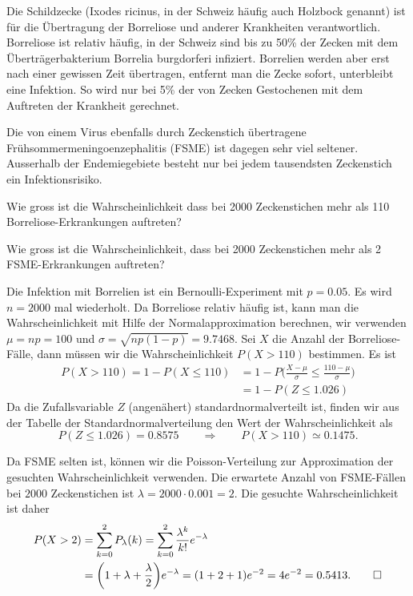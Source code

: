 Die Schildzecke (Ixodes ricinus, in der Schweiz häufig auch Holzbock genannt) 
ist für die Über\-tragung der Borreliose und anderer Krankheiten verantwortlich.
Borreliose ist relativ häufig, in der Schweiz sind bis zu 50\% der Zecken mit
dem Überträgerbakterium Borrelia burgdorferi infiziert.
Borrelien werden aber erst nach einer gewissen Zeit übertragen,
entfernt man die Zecke sofort, unterbleibt eine Infektion.
So wird nur bei 5\% der von Zecken Gestochenen mit dem Auftreten
der Krankheit gerechnet.

Die von einem Virus ebenfalls durch Zeckenstich übertragene
Frühsommermeningoenzephalitis (FSME) ist dagegen sehr viel seltener.
Ausserhalb der Endemiegebiete besteht nur bei jedem tausendsten Zeckenstich
ein Infektionsrisiko.

\begin{teilaufgaben}
\item
Wie gross ist die Wahrscheinlichkeit dass bei 2000 Zeckenstichen mehr als 110
Borreliose-Erkrankungen auftreten?
\item
Wie gross ist die Wahrscheinlichkeit, dass bei 2000 Zeckenstichen mehr als 2
FSME-Erkrankungen auftreten?
\end{teilaufgaben}

\begin{loesung}
\begin{teilaufgaben}
\item
Die Infektion mit Borrelien ist ein Bernoulli-Experiment mit $p=0.05$.
Es wird $n=2000$ mal wiederholt.
Da Borreliose relativ häufig ist, kann man die Wahrscheinlichkeit mit
Hilfe der Normalapproximation berechnen, wir verwenden
$\mu=np=100$ und $\sigma=\sqrt{np(1-p)}=9.7468$.
Sei $X$ die Anzahl der Borreliose-Fälle, dann müssen wir die
Wahrscheinlichkeit $P(X>110)$ bestimmen.
Es ist
\begin{align*}
P(X>110)
=
1-P(X\le 110)
&=
1-P\biggl(\frac{X-\mu}{\sigma}\le \frac{110-\mu}{\sigma}\biggr)
\\
&=
1-P(Z\le 1.026)
\end{align*}
Da die Zufallsvariable $Z$ (angenähert) standardnormalverteilt ist, finden wir
aus der Tabelle der Standardnormalverteilung den Wert der Wahrscheinlichkeit
als 
\[ 
P(Z\le 1.026) = 0.8575
\qquad\Rightarrow\qquad
P(X>110)\simeq 0.1475.
\]
\item
Da FSME selten ist, können wir die Poisson-Verteilung zur Approximation der
gesuchten Wahrscheinlichkeit verwenden.
Die erwartete Anzahl von FSME-Fällen bei $2000$ Zeckenstichen ist
$\lambda = 2000\cdot 0.001=2$.
Die gesuchte Wahrscheinlichkeit ist daher
\begin{align*}
P(X>2)
&=
\sum_{k=0}^2 P_\lambda(k)
=
\sum_{k=0}^2 \frac{\lambda^k}{k!} e^{-\lambda}
\\
&=
\biggl(1+\lambda+\frac{\lambda}2\biggr) e^{-\lambda}
=
(1+2+1) e^{-2}=4e^{-2}
=
0.5413.
\qedhere
\end{align*}
\end{teilaufgaben}
\end{loesung}




